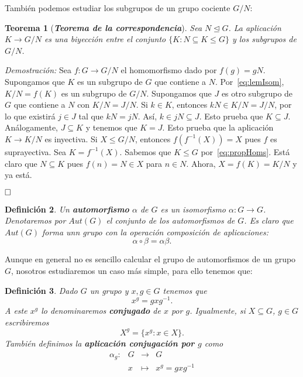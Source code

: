 \documentclass[12pt]{article}
\newtheorem{theorem}{Teorema}[section]
\newtheorem{definition}[theorem]{Definición}
\begin{document}
También podemos estudiar los subgrupos de un grupo cociente $G/N$:

\begin{theorem}[\textbf{\textit{Teorema de la correspondencia}}]
Sea $N \unlhd G$. La aplicación $K \longrightarrow G/N$ es una biyección entre el conjunto $\lbrace K: N \subseteq K \leq G \rbrace$ y los subgrupos de $G/N$.
\end{theorem}
\emph{Demostración: }Sea $f \colon G \longrightarrow G/N$ el homomorfismo dado por $f(g) = gN$. Supongamos que $K$ es un subgrupo de $G$ que contiene a $N$. Por~\ref{eq:lemIsom}, $K/N = f(K)$ es un subgrupo de $G/N$. Supongamos que $J$ es otro subgrupo de $G$ que contiene a $N$ con $K/N = J/N$. Si $k \in K$, entonces $kN \in K/N = J/N$, por lo que existirá $j \in J$ tal que $kN = jN$. Así, $k \in jN \subseteq J$. Esto prueba que $K \subseteq J$. Análogamente, $J \subseteq K$ y tenemos que $K=J$. Esto prueba que la aplicación $K \longrightarrow K/N$ es inyectiva. Si $X \leq G/N$, entonces $f(f^{-1}(X)) = X$ pues $f$ es suprayectiva. Sea $K = f^{-1}(X)$. Sabemos que $K \leq G$ por~\ref{eq:propHoms}. Está claro que $N \subseteq K$ pues $f(n) = N \in X$ para $n \in N$. Ahora, $X=f(K) = K/N$ y ya está.

$\hfill \square$

\begin{definition}Un \textbf{automorfismo} $\alpha$ de $G$ es un isomorfismo $\alpha \colon G \longrightarrow G$. Denotaremos por $Aut(G)$ el conjunto de los automorfismos de $G$. Es claro que $Aut(G)$ forma unn grupo con la operación composición de aplicaciones: $$\alpha \circ \beta = \alpha \beta.$$
\end{definition}

Aunque en general no es sencillo calcular el grupo de automorfismos de un grupo $G$, nosotros estudiaremos un caso más simple, para ello tenemos que:

\begin{definition} Dado $G$ un grupo y $x,g \in G$ tenemos que $$x^g=gxg^{-1}.$$ A este $x^g$ lo denominaremos \textbf{conjugado} de $x$ por $g$. Igualmente, si $X \subseteq G$, $g \in G$ escribiremos $$X^g = \lbrace x^g:x \in X \rbrace.$$ También definimos la \textbf{aplicación conjugación por $g$} como $$\begin{array}{rccl}
\alpha_g \colon &G&\longrightarrow &G \\
&x& \longmapsto &x^g = gxg^{-1}
\end{array}
$$
\end{definition}
\end{document}
